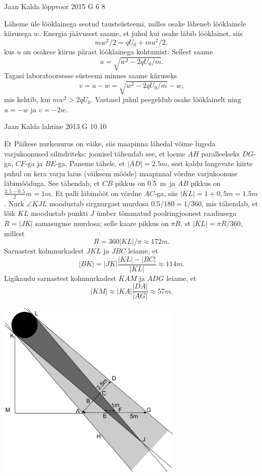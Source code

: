 \documentclass[11pt, twoside]{article}
\begin{document}
{%
{Jaan Kalda} %
{lõppvoor} %
{2015} %
{G 6} %
{8} %
{

\ifSolution
Läheme üle lööklainega seotud taustsüsteemi, milles osake läheneb lööklainele kiirusega $w$. Energia jäävusest saame, et juhul kui osake läbib lööklainet, siis 
\[
mw^2/2=qU_0+mu^2/2,
\]
kus $u$ on osakese kiirus pärast lööklainega kohtumist. Sellest saame
\[
u=\sqrt{w^2-2qU_0/m}.
\]
Tagasi laboratoorsesse süsteemi 
minnes saame kiiruseks
\[
v=u-w=\sqrt{w^2-2qU_0/m}-w,
\]
mis kehtib, kui $mw^2>2qU_0$. Vastasel juhul peegeldub osake lööklainelt ning
$u=-w$ ja $v=-2w$.
\fi
}

{Jaan Kalda} %
{lahtine} %
{2013} %
{G 10} %
{10} %
{

\ifSolution
Et Päikese nurksuurus on väike, siis maapinna lähedal võime lugeda varjukoonused silindriteks: joonisel tähendab see, et loeme $AH$ paralleelseks $DG$-ga, $CF$-ga ja $BE$-ga.
Paneme tähele, et $|AD|=\SI{2,5}m$, sest kaldu langevate kiirte puhul on kera varju laius (väiksem mõõde) maapinnal võrdne varjukoonuse läbimõõduga.
See tähendab, et $CB$ pikkus on \SI{0,5}m ja $AB$ pikkus on $\frac{2,5-0,5}2\SI{}m=\SI{1}m$. Et palli läbimõõt on võrdne $AC$-ga, siis $|KL|=1+0,5\SI{}m=\SI{1,5}m$.
Nurk $\angle KJL$ moodustab sirgnurgast murdosa $\num{0,5}/180=1/360$, mis tähendab, et lõik $KL$ moodustab punkti $J$ ümber tõmmatud poolringjoonest raadiusega $R=|JK|$
samasuguse murdosa; selle kaare pikkus on $\pi R$, st $|KL|=\pi R /360$, millest 
\[
R=360|KL|/\pi\approx \SI{172}m.
\]
Sarnastest kolmnurkadest $JKL$ ja $JBC$ leiame, et 
\[
|BK|=|JK|\frac{|KL|-|BC|}{|KL|}\approx \SI{114}m.
\]
Ligikaudu sarnastest kolmnurkadest $KAM$ ja $ADG$ leiame, et
\[
|KM|\approx |KA|\frac{|DA|}{|AG|}\approx \SI{57}m.
\]

\begin{center}
\includegraphics[width=250pt]{2013-lahg-10-pxike-pall-vari}%
\end{center}
\fi
}

}
\end{document}
